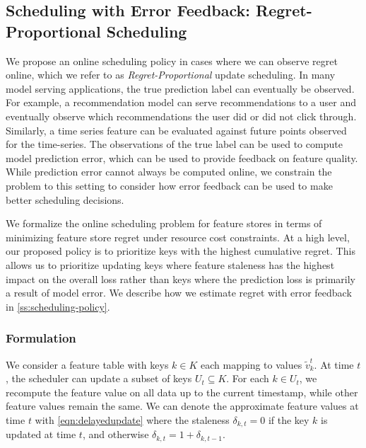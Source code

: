 \subsection{Scheduling with Error Feedback: Regret-Proportional Scheduling}
\label{ss:online-scheduling-error-feedback}
We propose an online scheduling policy in cases where we can observe regret online, which we refer to as \textit{Regret-Proportional} update scheduling. In many model serving applications, the true prediction label can eventually be observed. For example, a recommendation model can serve recommendations to a user and eventually observe which recommendations the user did or did not click through. Similarly, a time series feature can be evaluated against future points observed for the time-series. The observations of the true label can be used to compute model prediction error, which can be used to provide feedback on feature quality. While prediction error cannot always be computed online, we constrain the problem to this setting to consider how error feedback can be used to make better scheduling decisions. 

We formalize the online scheduling problem for feature stores in terms of minimizing feature store regret under resource cost constraints.  At a high level, our proposed policy is to prioritize keys with the highest cumulative regret. 
This allows us to prioritize updating keys where feature staleness has the highest impact on the overall loss rather than keys where the prediction loss is primarily a result of model error. 
We describe how we estimate regret with error feedback in \cref{ss:scheduling-policy}. 

\subsubsection{Formulation}
We consider a feature table with keys $k\in K$ each mapping to values $\tilde{v}_k^t$. At time $t$, the scheduler can update a subset of keys $U_t \subseteq K$. For each $k\in U_t$, we recompute the feature value on all data up to the current timestamp, while other feature values remain the same. We can denote the approximate feature values at time $t$ with \cref{eqn:delayedupdate} where the staleness $\delta_{k,t}=0$ if the key $k$ is updated at time $t$, and otherwise $\delta_{k,t}=1+\delta_{k,t-1}$. 


